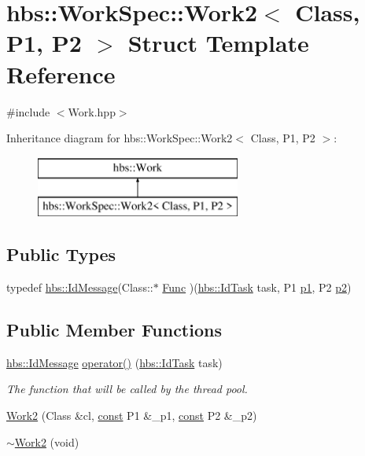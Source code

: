 \hypertarget{structhbs_1_1_work_spec_1_1_work2}{\section{hbs\-:\-:Work\-Spec\-:\-:Work2$<$ Class, P1, P2 $>$ Struct Template Reference}
\label{structhbs_1_1_work_spec_1_1_work2}
}


{\ttfamily \#include $<$Work.\-hpp$>$}

Inheritance diagram for hbs\-:\-:Work\-Spec\-:\-:Work2$<$ Class, P1, P2 $>$\-:\begin{figure}[H]
\begin{center}
\leavevmode
\includegraphics[height=2.000000cm]{structhbs_1_1_work_spec_1_1_work2}
\end{center}
\end{figure}
\subsection*{Public Types}
\begin{DoxyCompactItemize}
\item 
typedef \hyperlink{namespacehbs_a6d744a52db9bca0a9752a009118641f4}{hbs\-::\-Id\-Message}(Class\-::$\ast$ \hyperlink{structhbs_1_1_work_spec_1_1_work2_a029470a2ff656e7a643d9e074254dd77}{Func} )(\hyperlink{namespacehbs_aab8d06205ac2b0b14186327fd6c1c0d6}{hbs\-::\-Id\-Task} task, P1 \hyperlink{structhbs_1_1_work_spec_1_1_work2_a340ca28ca16ad76091a899e183ed48c1}{p1}, P2 \hyperlink{structhbs_1_1_work_spec_1_1_work2_a2d8479e3bbdf73c26b1199073757390f}{p2})
\end{DoxyCompactItemize}
\subsection*{Public Member Functions}
\begin{DoxyCompactItemize}
\item 
\hyperlink{namespacehbs_a6d744a52db9bca0a9752a009118641f4}{hbs\-::\-Id\-Message} \hyperlink{structhbs_1_1_work_spec_1_1_work2_acd0cc67099d12b7bae817b06d5fb0f6b}{operator()} (\hyperlink{namespacehbs_aab8d06205ac2b0b14186327fd6c1c0d6}{hbs\-::\-Id\-Task} task)
\begin{DoxyCompactList}\small\item\em The function that will be called by the thread pool. \end{DoxyCompactList}\item 
\hyperlink{structhbs_1_1_work_spec_1_1_work2_a0fbe589d90197b8084b5ac05c8dd422f}{Work2} (Class \&cl, \hyperlink{term__entry_8h_a57bd63ce7f9a353488880e3de6692d5a}{const} P1 \&\-\_\-p1, \hyperlink{term__entry_8h_a57bd63ce7f9a353488880e3de6692d5a}{const} P2 \&\-\_\-p2)
\item 
\hyperlink{structhbs_1_1_work_spec_1_1_work2_a643de75c0e4e33f0c21e30f154293532}{$\sim$\-Work2} (void)
\end{DoxyCompactItemize}
